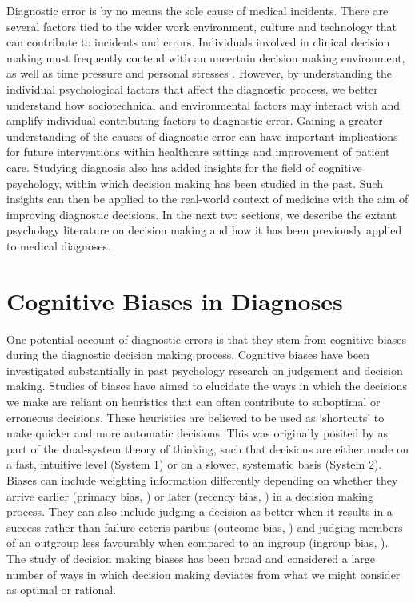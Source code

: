 \documentclass[a4paper, nobind]{templates/ociamthesis}
\begin{document}
\hfill\break
Diagnostic error is by no means the sole cause of medical incidents. There are several factors tied to the wider work environment, culture and technology that can contribute to incidents and errors. Individuals involved in clinical decision making must frequently contend with an uncertain decision making environment, as well as time pressure and personal stresses \autocite{yates_physician_2020}. However, by understanding the individual psychological factors that affect the diagnostic process, we better understand how sociotechnical and environmental factors may interact with and amplify individual contributing factors to diagnostic error. Gaining a greater understanding of the causes of diagnostic error can have important implications for future interventions within healthcare settings and improvement of patient care. Studying diagnosis also has added insights for the field of cognitive psychology, within which decision making has been studied in the past. Such insights can then be applied to the real-world context of medicine with the aim of improving diagnostic decisions. In the next two sections, we describe the extant psychology literature on decision making and how it has been previously applied to medical diagnoses.

\section{Cognitive Biases in Diagnoses}\label{cognitive-biases-in-diagnoses}

One potential account of diagnostic errors is that they stem from cognitive biases during the diagnostic decision making process. Cognitive biases have been investigated substantially in past psychology research on judgement and decision making. Studies of biases have aimed to elucidate the ways in which the decisions we make are reliant on heuristics that can often contribute to suboptimal or erroneous decisions. These heuristics are believed to be used as `shortcuts' to make quicker and more automatic decisions. This was originally posited by \textcite{kahneman_thinking_2011} as part of the dual-system theory of thinking, such that decisions are either made on a fast, intuitive level (System 1) or on a slower, systematic basis (System 2). Biases can include weighting information differently depending on whether they arrive earlier (primacy bias, \textcite{saetrevik_anchoring_2020}) or later (recency bias, \textcite{chapman_order_1996}) in a decision making process. They can also include judging a decision as better when it results in a success rather than failure ceteris paribus (outcome bias, \autocite{baron_outcome_1988,aiyer_outcomes_2023}) and judging members of an outgroup less favourably when compared to an ingroup (ingroup bias, \autocite{tarrant_social_2012}). The study of decision making biases has been broad and considered a large number of ways in which decision making deviates from what we might consider as optimal or rational.
\end{document}
